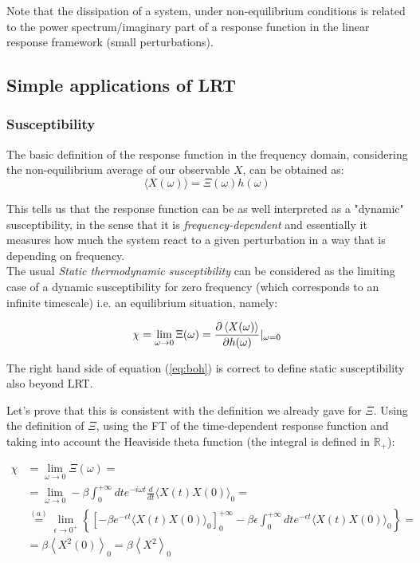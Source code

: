\documentclass[\main/main.tex]{subfiles}
\begin{document}
Note that the dissipation of a system, under non-equilibrium conditions is related to the power spectrum/imaginary part of a response function in the linear response framework (small perturbations).

\subsection{Simple applications of LRT}

\subsubsection{Susceptibility}

The basic definition of the response function in the frequency domain, considering the non-equilibrium average of our observable $X$, can be obtained as:
\begin{equation}
    \langle X(\omega)\rangle=\Xi(\omega) h(\omega)
\end{equation}

This tells us that the response function can be as well interpreted as a "dynamic" susceptibility, in the sense that it is \textit{frequency-dependent} and essentially it measures how much the system react to a given perturbation in a way that is depending on frequency. \\

The usual \textit{Static thermodynamic susceptibility} can be considered as the limiting case of a dynamic susceptibility for zero frequency (which corresponds to an infinite timescale) i.e. an equilibrium situation, namely:

\begin{equation}
    \chi =\lim_{\omega\to 0}\Xi(\omega)=\frac{\partial \left\langle X(\omega) \right\rangle}{\partial h(\omega)}|_{\omega=0}
    \label{eq:boh}
\end{equation}

The right hand side of equation (\ref{eq:boh}) is correct to define static susceptibility also beyond LRT.

Let's prove that this is consistent with the definition we already gave for $\Xi$. Using the definition of $\Xi$, using the FT of the time-dependent response function and taking into account the Heaviside theta function (the integral is defined in $\mathbb{R}_+$):

\begin{align}
\chi& =\lim _{\omega \rightarrow 0} \Xi(\omega) = \\
&=\lim_{\omega\longrightarrow 0}-\beta \int_{0}^{+\infty} d t e^{-i\omega t} \frac{d}{d t}\langle X(t) X(0)\rangle_{0}= \\
&\overset{(a)}{=}\lim _{\epsilon \rightarrow 0^{+}}\left\{\left[-\beta e^{-\epsilon t}\langle X(t) X(0)\rangle_{0}\right]_{0}^{+\infty}-\beta \epsilon \int_{0}^{+\infty} d t e^{-\epsilon t}\langle X(t) X(0)\rangle_{0}\right\}= \\
&=\beta\left\langle X^{2}(0)\right\rangle_{0}=\beta\left\langle X^{2}\right\rangle_{0}
\end{align}
\end{document}
